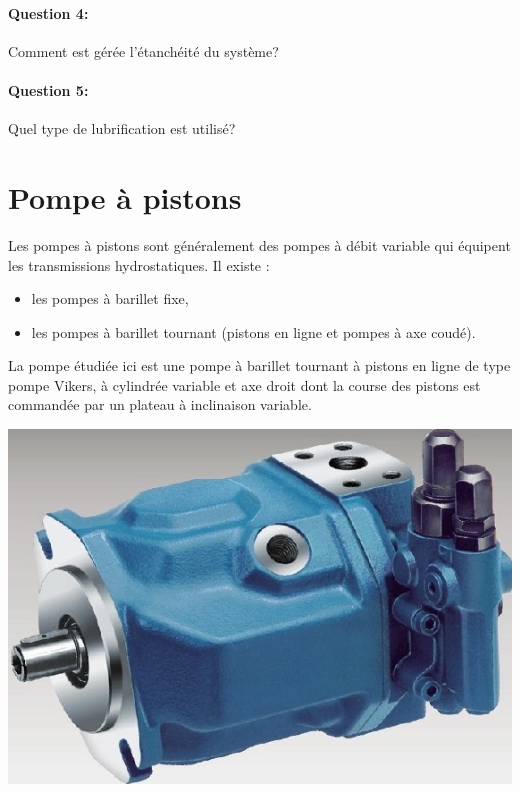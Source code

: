 \paragraph{Question 4:} Comment est gérée l'étanchéité du système?

\paragraph{Question 5:} Quel type de lubrification est utilisé?



\newpage

\section{Pompe à pistons}

\begin{minipage}{0.45\linewidth}
Les pompes à pistons sont généralement des pompes à débit variable qui équipent les transmissions 
hydrostatiques. Il existe :
\begin{itemize}
 \item les pompes à barillet fixe,
 \item les pompes à barillet tournant (pistons en ligne et pompes à axe coudé).
\end{itemize}

La pompe étudiée ici est une pompe à barillet tournant à pistons en ligne de type pompe Vikers, à cylindrée variable et axe droit dont la course des pistons est commandée par un plateau à inclinaison variable.
\end{minipage}
\hfill
\begin{minipage}{0.45\linewidth}
 \centering\includegraphics[width=0.8\linewidth]{img/Piston-Variable-Pump.jpg}
\end{minipage}

